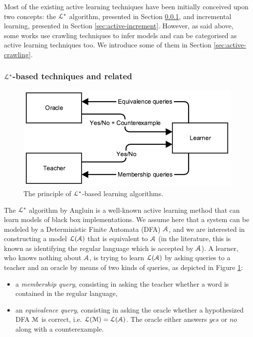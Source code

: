 Most of the existing active learning techniques have been
initially conceived upon two concepts: the $\EuScript{L}^*$
algorithm, presented in Section \ref{sec:active-letoile}, and
incremental learning, presented in Section
\ref{sec:active-increment}. However, as said above, some works
use crawling techniques to infer models and can be categorised as
active learning techniques too. We introduce some of them in
Section \ref{sec:active-crawling}.

\subsubsection{$\EuScript{L}^*$-based techniques and related}
\label{sec:active-letoile}

\begin{figure}[h]
    \begin{center}
        \includegraphics[width=0.9\linewidth]{figures/angluin.png}
    \end{center}

    \caption{The principle of $\EuScript{L}^*$-based learning
    algorithms.}
    \label{fig:angluin}
\end{figure}

The $\EuScript{L}^*$ algorithm by Angluin \cite{Angluin198787} is
a well-known active learning method that can learn models of
black box implementations. We assume here that a system can be
modeled by a Deterministic Finite Automata (DFA) $\EuScript{A}$,
and we are interested in constructing a model
$\EuScript{L}(\EuScript{A})$ that is equivalent to $\EuScript{A}$
(in the literature, this is known as identifying the regular
language which is accepted by $\EuScript{A}$). A learner, who
knows nothing about $\EuScript{A}$, is trying to learn
$\EuScript{L}(\EuScript{A})$ by asking queries to a teacher and
an oracle by means of two kinds of queries, as depicted in Figure
\ref{fig:angluin}:

\begin{itemize}
\item a \textit{membership query}, consisting in asking the
teacher whether a word is contained in the regular language,

\item an \textit{equivalence query}, consisting in asking the
oracle whether a hypothesized DFA $\EuScript{M}$ is correct, i.e.
$\EuScript{L}(\EuScript{M}) = \EuScript{L}(\EuScript{A})$.  The
oracle either answers $yes$ or $no$ along with a counterexample.
\end{itemize}

